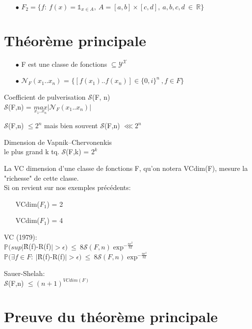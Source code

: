 \documentclass[a4paper]{report}
\begin{document}
\begin{itemize}
\item[$\bullet$] $F_2 = \{f:\ f(x)=\mathds{1}_{x\in A},\ A=[a,b]\times[c,d],\ a,b,c,d\ \in \ \mathds{R}\}$\\
\end{itemize}

\section{Théorème principale}
\begin{itemize}
\item[$\bullet$] F est une classe de fonctions $ \subseteq \mathcal{Y}^\mathcal{X}$\\
\item[$\bullet$] $\mathcal{N}_F (x_1..x_n)$ = $\{[f(x_1)..f(x_n)]\in \{0,i\}^n \ ,f\in F\}$\\
\end{itemize}

\begin{definition}
Coefficient de pulverisation $\mathcal{S}$(F, n)\\
$\mathcal{S}$(F,n) = $\underset{x_1..x_n}{max}|\mathcal{N}_F (x_1..x_n)|$\\
\end{definition}

\begin{remark}
$\mathcal{S}$(F,n) $ \leq 2^n$ mais bien souvent $\mathcal{S}$(F,n) $ \lll 2^n $\\
\end{remark}

\begin{definition}
Dimension de Vapnik–Chervonenkis\\
le plus grand k tq. $\mathcal{S}$(F,k) = $2^k$\\
\end{definition}

La VC dimension d'une classe de fonctions F, qu'on  notera VCdim(F), mesure la "richesse" de cette classe.\\
Si on revient sur nos exemples précédents:
\begin{itemize}
\item[]VCdim($F_1$) = 2
\item[]VCdim($F_1$) = 4\\
\end{itemize}

\begin{theorem}
VC (1979):\\
$\mathds{P}(sup|$\^R(f)-R(f)$| > \epsilon)\ \leq \ 8\mathcal{S}(F,n) \exp ^{-\frac{n\epsilon^2}{32}}$\\
$\mathds{P}(\exists f \in F:\ |$\^R(f)-R(f)$| > \epsilon)\ \leq \ 8\mathcal{S}(F,n)\exp ^{-\frac{n\epsilon^2}{32}}$\\
\end{theorem}

\begin{lemma}
Sauer-Shelah:\\
$\mathcal{S}$(F,n) $ \leq (n+1)^{VCdim(F)}$
\end{lemma}

\section{Preuve du théorème principale}
\end{document}

